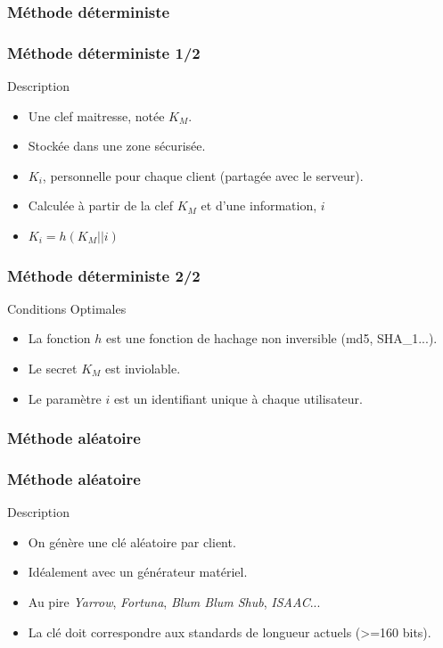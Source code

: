 \documentclass{beamer}
\begin{document}
 \subsubsection{M\'ethode d\'eterministe}
\begin{frame}
\frametitle{M\'ethode d\'eterministe 1/2}
\begin{block}{Description}
\begin{itemize}
\item Une clef maitresse, not\'ee $K_M$.
\pause\item Stock\'ee dans une zone s\'ecuris\'ee.
\pause\item $K_i$, personnelle pour chaque client (partag\'ee avec le serveur).
\pause\item Calcul\'ee \`a partir de la clef $K_M$ et d'une information, $i$
\pause\item $K_i = h(K_M || i)$ 
\end{itemize}
\end{block}
\end{frame}

\begin{frame}
\frametitle{M\'ethode d\'eterministe 2/2}
\begin{block}{Conditions Optimales}
\begin{itemize}
     \item La fonction $h$ est une fonction de hachage non inversible (md5, SHA\_1...).
 \pause    \item Le secret $K_M$ est inviolable.
 \pause    \item Le param\`etre $i$ est un identifiant unique \`a chaque utilisateur.
    \end{itemize}
\end{block}

\end{frame}
 \subsubsection{M\'ethode al\'eatoire}
 
 \begin{frame}
 \frametitle{M\'ethode al\'eatoire}
 \begin{block}{Description}
  \begin{itemize}
\item On g\'en\`ere une cl\'e al\'eatoire par client.
\pause\item Id\'ealement avec un g\'en\'erateur mat\'eriel.
\pause\item Au pire \emph{Yarrow}, \emph{Fortuna}, \emph{Blum Blum Shub}, \emph{ISAAC}...
\pause\item La cl\'e doit correspondre aux standards de longueur actuels (>=160 bits).
\end{itemize}
 \end{block}

 
 \end{frame}
 
\end{document}
